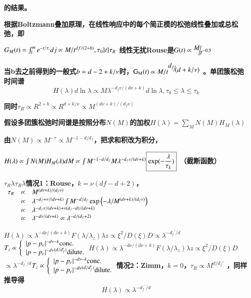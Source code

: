 \documentclass{article} %
\begin{document}
{\bf 的结果。}


{\bf  根据Boltzmann叠加原理，在线性响应中的每个简正模的松弛线性叠加或总松弛，即}

\noindent 
{\bf $G_{M} (t)=\smallint _{1}^{m} e^{-t/\tau _{i} } dj\propto M/t^{df/(2+b)} ,\tau _{0} \mathrm{\} }t\mathrm{\} }\tau _{R} $ 线性无扰Rouse是$G(t)\propto {\raise0.7ex\hbox{$ M $}\!\mathord{\left/ {\vphantom {M t^{-0.5} }} \right. \kern-\nulldelimiterspace}\!\lower0.7ex\hbox{$ t^{-0.5}  $}} $}


{\bf  当b去之前得到的一般式$b=d-2+k{\rm /}\nu $时，${\rm G}_{{\rm M}} (t)\propto M/t^{{\raise0.7ex\hbox{$ d_{f}  $}\!\mathord{\left/ {\vphantom {d_{f}  (d+k/\nu )}} \right. \kern-\nulldelimiterspace}\!\lower0.7ex\hbox{$ (d+k/\nu ) $}} } $ 。单团簇松弛时间谱
\[H(\lambda )d\ln \lambda \propto M\lambda ^{-d_{f} v/(d\nu +k)} d\ln \lambda ,\tau _{0} \le \lambda \le \tau _{k} \] }

{\bf 同时$\tau _{R} \propto R^{2+b} \propto R^{d+k/\nu } \propto M^{(d\nu +k)/(d_{f} \nu )} $}


{\bf  假设多团簇松弛时间谱是按照分布$N(M)$的加权$H(\lambda )={\mathop{\sum }\limits_{M}} N(M)H_{M} (\lambda )$}

\noindent 
{\bf 由$N(M)\propto M^{-\tau } \propto M^{-1-d/d_{f} } $，把求和积改为积分，}

\noindent 
{\bf $H(\lambda )\propto \smallint N(M)H_{M} (\lambda )dM\propto \smallint M^{-1-d/d_{f} } M\lambda ^{-d_{f} v/(dv+k)} \boxed{\exp (-\frac{\lambda }{\tau _{k} } )} $ （截断函数）}

\noindent 
{\bf $\tau _{R} $$\lambda $$\tau _{R} $$\lambda $情况1：Rouse，$k=\nu \left(df-d+2\right)$，$\begin{array}{rcl} {\tau {}_{R} } & {\propto } & {M^{(d\nu +k)/(d_{f} \nu )} } \\ {} & {\propto } & {\lambda ^{-d_{f} +\nu /(d\nu +k)} \smallint M^{-d/d_{f} } \exp \left(-\lambda /M^{(d\nu +k)/(d_{f} v)} \right)} \\ {} & {\propto } & {\lambda ^{-d_{f} \nu /(d\nu +k)} {}^{+\nu (d_{f} -d)/(d\nu +k)} } \\ {} & {\propto } & {\lambda ^{-dv/(dv+k)} \propto \lambda ^{-d/(d_{f} +2)} } \end{array}$}

\noindent 
{\bf $H(\lambda )\propto \lambda ^{-d\nu /(d\nu +k)} F(\lambda /\lambda _{z} )$$\lambda z\propto \xi ^{2} /D(\xi )$$D$$\propto \lambda ^{-d_{f} {}^{{'} } /d} $$T_{z} \propto \left\{\begin{array}{l} {|p-p_{c} |^{-d\nu -k} {\rm conc}.} \\ {|p-p_{c} |^{-d\nu } {}^{(d/d_{f} ')} {\rm dilute.}} \end{array}\right. $$H(\lambda )\propto \lambda ^{-d\nu /(d\nu +k)} F(\lambda /\lambda _{z} )$$\lambda z\propto \xi ^{2} /D(\xi )$$D$$\propto \lambda ^{-d_{f} {}^{{'} } /d} $$T_{z} \propto \left\{\begin{array}{l} {|p-p_{c} |^{-d\nu -k} {\rm conc}.} \\ {|p-p_{c} |^{-d\nu } {}^{(d/d_{f} ')} {\rm dilute.}} \end{array}\right. $情况2：Zimm，$k=0$，$\tau _{R} \propto M^{d/d_{f} '} $ ，同样推导得 
\[H(\lambda )\propto \lambda ^{-d_{f} {}^{{'} } /d} \] }
\end{document}
